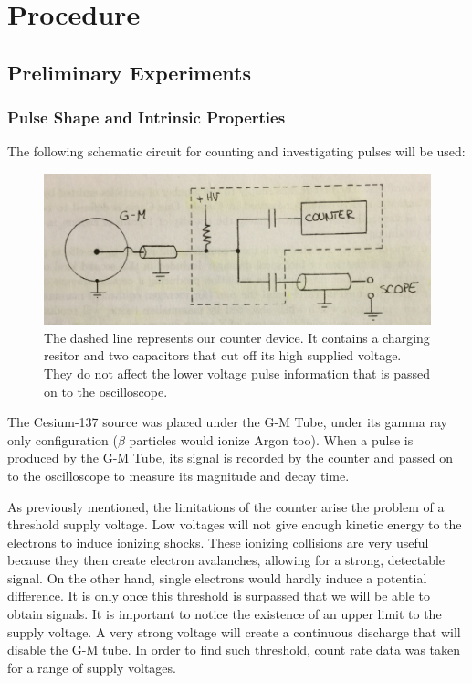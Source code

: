 \documentclass[a4paper]{article}
\begin{document}
  \section{Procedure}
  \subsection{Preliminary Experiments}
  \subsubsection{Pulse Shape and Intrinsic Properties}
  The following schematic circuit for counting and investigating pulses will be used: 
  \begin{figure}[h]
  \includegraphics[scale=0.8]{circuitdiagram} 
  \centering
  \caption{The dashed line represents our counter device. It contains a charging resitor and two capacitors that cut off its high supplied voltage. They do not affect the lower voltage pulse information that is passed on to the oscilloscope.}
  \end{figure}
  
  The Cesium-137 source was placed under the G-M Tube, under its gamma ray only configuration ($\beta$ particles would ionize Argon too). When a pulse is produced by the G-M Tube, its signal is recorded by the counter and passed on to the oscilloscope to measure its magnitude and decay time.
  
  As previously mentioned, the limitations of the counter arise the problem of a threshold supply voltage. Low voltages will not give enough kinetic energy to the electrons to induce ionizing shocks. These ionizing collisions are very useful because they then create electron avalanches, allowing for a strong, detectable signal. On the other hand, single electrons would hardly induce a potential difference. It is only once this threshold is surpassed that we will be able to obtain signals. It is important to notice the existence of an upper limit to the supply voltage. A very strong voltage will create a continuous discharge that will disable the G-M tube. In order to find such threshold, count rate data was taken for a range of supply voltages.
  
\end{document}
